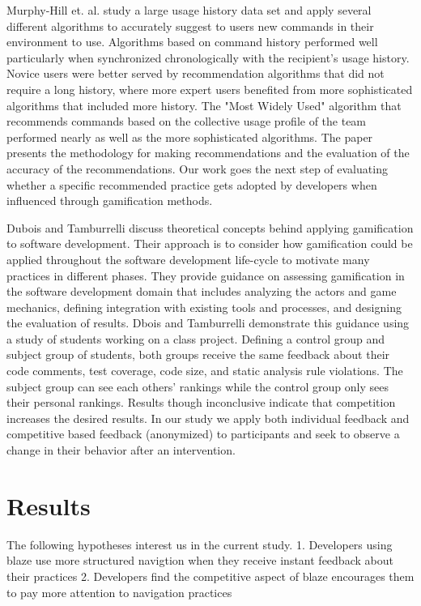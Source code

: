 \documentclass{sig-alternate}
\begin{document}
Murphy-Hill et. al. study a large usage history data set and apply several different algorithms to accurately suggest to users new commands in their environment to use.\cite{MurphyHill2012Improving} Algorithms based on command history performed well particularly when synchronized chronologically with the recipient's usage history. Novice users were better served by recommendation algorithms that did not require a long history, where more expert users benefited from more sophisticated algorithms that included more history. The "Most Widely Used" algorithm that recommends commands based on the collective usage profile of the team performed nearly as well as the more sophisticated algorithms. The paper presents the methodology for making recommendations and the evaluation of the accuracy of the recommendations. Our work goes the next step of evaluating whether a specific recommended practice gets adopted by developers when influenced through gamification methods.

Dubois and Tamburrelli discuss theoretical concepts behind applying gamification to software development. \cite{Dubois2013Understanding} Their approach is to consider how gamification could be applied throughout the software development life-cycle to motivate many practices in different phases.  They provide guidance on assessing gamification in the software development domain that includes analyzing the actors and game mechanics, defining integration with existing tools and processes, and designing the evaluation of results.  Dbois and Tamburrelli demonstrate this guidance using a study of students working on a class project.  Defining a control group and subject group of students, both groups receive the same feedback about their code comments, test coverage, code size, and static analysis rule violations.  The subject group can see each others' rankings while the control group only sees their personal rankings.  Results though inconclusive indicate that competition increases the desired results.  In our study we apply both individual feedback and competitive based feedback (anonymized) to participants and seek to observe a change in their behavior after an intervention.

\section{Results}
The following hypotheses interest us in the current study.  
1. Developers using blaze use more structured navigtion when they receive instant feedback about their practices
2. Developers find the competitive aspect of blaze encourages them to pay more attention to navigation practices
\end{document}
